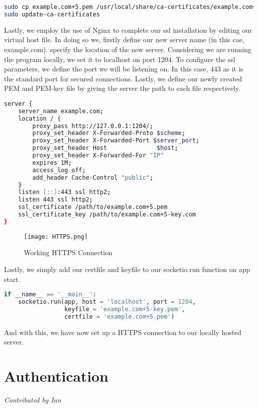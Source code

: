 \documentclass{article}
\begin{document}
\begin{lstlisting}[language=bash]
sudo cp example.com+5.pem /usr/local/share/ca-certificates/example.com+5.crt
sudo update-ca-certificates
\end{lstlisting}

Lastly, we employ the use of Nginx to complete our ssl installation by editing our virtual host file. In doing so we, firstly define our new server name (in this cae, example.com). specify the location of the new server. Considering we are running the program locally, we set it to localhost on port 1204. To configure the ssl parameters, we define the port we will be listening on. In this case, 443 as it is the standard port for secured connections. Lastly, we define our newly created PEM and PEM-key file by giving the server the path to each file respectively.

\begin{lstlisting}[language=bash]
server {
    server_name example.com;
    location / {
        proxy_pass http://127.0.0.1:1204/;
        proxy_set_header X-Forwarded-Proto $scheme;
        proxy_set_header X-Forwarded-Port $server_port;
        proxy_set_header Host              $host;
        proxy_set_header X-Forwarded-For "IP"
        expires 1M;
        access_log off;
        add_header Cache-Control "public";
    }
    listen [::]:443 ssl http2;
    listen 443 ssl http2;
    ssl_certificate /path/to/example.com+5.pem
    ssl_certificate_key /path/to/example.com+5-key.com
}
\end{lstlisting}

\begin{figure}
    \centering
    \texttt{[image: HTTPS.png]}
    \caption{Working HTTPS Connection}
    \label{fig:enter-label}
\end{figure}

Lastly, we simply add our certfile and keyfile to our socketio.run function on app start.
\begin{lstlisting}[language=Python]
if __name__ == '__main__':
    socketio.run(app, host = 'localhost', port = 1204,
                 keyfile = 'example.com+5-key.pem',
                 certfile = 'example.com+5.pem')
\end{lstlisting}

And with this, we have now set up a HTTPS connection to our locally hosted server.

\section{Authentication}
\textit{Contributed by Ian}
\end{document}
